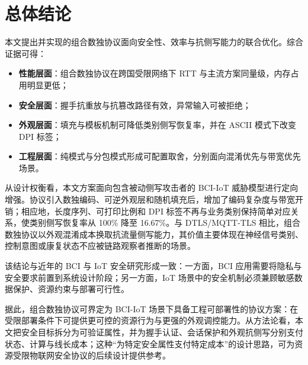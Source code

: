 \section{总体结论}
本文提出并实现的组合数独协议面向安全性、效率与抗侧写能力的联合优化。综合证据可得：
\begin{itemize}
  \item \textbf{性能层面}：组合数独协议在跨国受限网络下 RTT 与主流方案同量级，内存占用明显更低；
  \item \textbf{安全层面}：握手抗重放与抗篡改路径有效，异常输入可被拒绝；
  \item \textbf{外观层面}：填充与模板机制可降低类别侧写恢复率，并在 ASCII 模式下改变 DPI 标签；
  \item \textbf{工程层面}：纯模式与分包模式形成可配置取舍，分别面向混淆优先与带宽优先场景。
\end{itemize}

从设计权衡看，本文方案面向包含被动侧写攻击者的 BCI-IoT 威胁模型进行定向增强。协议引入数独编码、可逆外观层和随机填充后，增加了编码复杂度与带宽开销；相应地，长度序列、可打印比例和 DPI 标签不再与业务类别保持简单对应关系，使类别侧写恢复率从 100\% 降至 16.67\%。与 DTLS/MQTT-TLS 相比，组合数独协议以外观混淆成本换取抗流量侧写能力，其价值主要体现在神经信号类别、控制意图或康复状态不应被链路观察者推断的场景。

该结论与近年的 BCI 与 IoT 安全研究形成一致：一方面，BCI 应用需要将隐私与安全要求前置到系统设计阶段\cite{kapitonova2022framework,maiseli2023bci}；另一方面，IoT 场景中的安全机制必须兼顾敏感数据保护、资源约束与部署可行性\cite{liu2022accesscontrol,trabelsi2023iotaccess}。

据此，组合数独协议可界定为 BCI-IoT 场景下具备工程可部署性的协议方案：在受限部署条件下可提供更可控的资源行为与更强的外观调控能力。从方法论看，本文把安全目标拆分为可验证属性，并为握手认证、会话保护和外观抗侧写分别支付状态、计算与线长成本；这种“为特定安全属性支付特定成本”的设计思路，可为资源受限物联网安全协议的后续设计提供参考。

